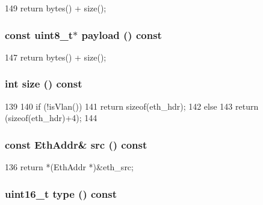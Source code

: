 \begin{DoxyCode}
149 { return bytes() + size(); }
\end{DoxyCode}
\hypertarget{structNet_1_1EthHdr_a5f0d069ddb9d067af9e94963bd1fc7a2}{
\subsubsection[{payload}]{\setlength{\rightskip}{0pt plus 5cm}const uint8\_\-t$\ast$ payload () const}}
\label{structNet_1_1EthHdr_a5f0d069ddb9d067af9e94963bd1fc7a2}



\begin{DoxyCode}
147 { return bytes() + size(); }
\end{DoxyCode}
\hypertarget{structNet_1_1EthHdr_ab8e4e3e2a7bf18888b71bdf9dda0770b}{
\subsubsection[{size}]{\setlength{\rightskip}{0pt plus 5cm}int size () const}}
\label{structNet_1_1EthHdr_ab8e4e3e2a7bf18888b71bdf9dda0770b}



\begin{DoxyCode}
139                      {
140         if (!isVlan())
141             return sizeof(eth_hdr);
142         else
143             return (sizeof(eth_hdr)+4);
144     }
\end{DoxyCode}
\hypertarget{structNet_1_1EthHdr_a51749901bf4eabf2967325c9b4482d35}{
\subsubsection[{src}]{\setlength{\rightskip}{0pt plus 5cm}const {\bf EthAddr}\& src () const}}
\label{structNet_1_1EthHdr_a51749901bf4eabf2967325c9b4482d35}



\begin{DoxyCode}
136 { return *(EthAddr *)&eth_src; }
\end{DoxyCode}
\hypertarget{structNet_1_1EthHdr_a236542f3042d3c2ac7d98d1a7ad75269}{
\subsubsection[{type}]{\setlength{\rightskip}{0pt plus 5cm}uint16\_\-t type () const}}
\label{structNet_1_1EthHdr_a236542f3042d3c2ac7d98d1a7ad75269}



